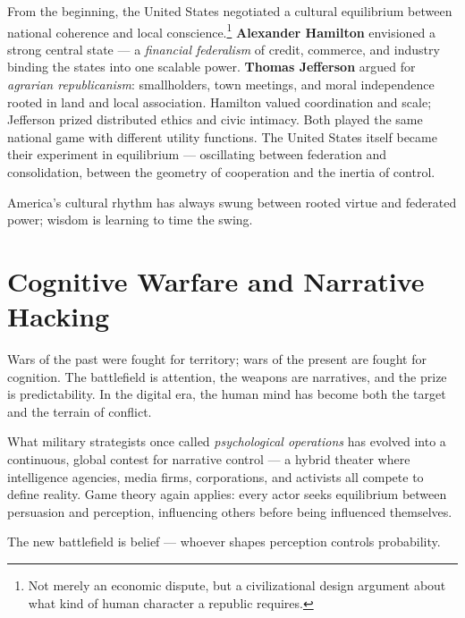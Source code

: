 \documentclass[12pt,twoside]{book}
\begin{document}
From the beginning, the United States negotiated a cultural equilibrium between national coherence and local conscience.\footnote{Not merely an economic dispute, but a civilizational design argument about what kind of human character a republic requires.}  
\textbf{Alexander Hamilton} envisioned a strong central state — a \emph{financial federalism} of credit, commerce, and industry binding the states into one scalable power.  
\textbf{Thomas Jefferson} argued for \emph{agrarian republicanism}: smallholders, town meetings, and moral independence rooted in land and local association.  
Hamilton valued coordination and scale; Jefferson prized distributed ethics and civic intimacy.  
Both played the same national game with different utility functions.  
The United States itself became their experiment in equilibrium — oscillating between federation and consolidation, between the geometry of cooperation and the inertia of control.

\begin{keyidea}
America’s cultural rhythm has always swung between rooted virtue and federated power; wisdom is learning to time the swing.
\end{keyidea}

\chapter{Cognitive Warfare and Narrative Hacking}

Wars of the past were fought for territory; wars of the present are fought for cognition.  
The battlefield is attention, the weapons are narratives, and the prize is predictability.  
In the digital era, the human mind has become both the target and the terrain of conflict.

What military strategists once called \emph{psychological operations} has evolved into a continuous, global contest for narrative control — a hybrid theater where intelligence agencies, media firms, corporations, and activists all compete to define reality.  
Game theory again applies: every actor seeks equilibrium between persuasion and perception, influencing others before being influenced themselves.\\

\begin{keyidea}
The new battlefield is belief — whoever shapes perception controls probability.
\end{keyidea}
\end{document}
